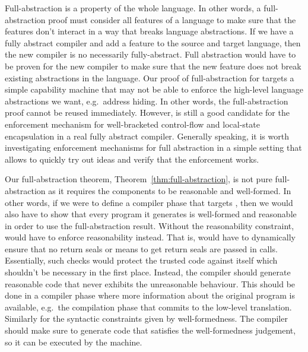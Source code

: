 \begin{jversion}

  Full-abstraction is a property of the whole language.
  In other words, a full-abstraction proof must consider all features of a language to make sure that the features don't interact in a way that breaks language abstractions.
  If we have a fully abstract compiler and add a feature to the source and target language, then the new compiler is no necessarily fully-abstract.
  Full abstraction would have to be proven for the new compiler to make sure that the new feature does not break existing abstractions in the language.
  Our proof of full-abstraction for \stktokens{} targets a simple capability machine that may not be able to enforce the high-level language abstractions we want, e.g.\ address hiding.
  In other words, the full-abstraction proof cannot be reused immediately.
  However, \stktokens{} is still a good candidate for the enforcement mechanism for well-bracketed control-flow and local-state encapsulation in a real fully abstract compiler.
  Generally speaking, it is worth investigating enforcement mechanisms for full abstraction in a simple setting that allows to quickly try out ideas and verify that the enforcement works.

  Our full-abstraction theorem, Theorem~\ref{thm:full-abstraction}, is not pure full-abstraction as it requires the components to be reasonable and well-formed.
  In other words, if we were to define a compiler phase that targets \srccm{}, then we would also have to show that every program it generates is well-formed and reasonable in order to use the full-abstraction result.
  Without the reasonability constraint, \stktokens{} would have to enforce reasonability instead.
  That is, \stktokens{} would have to dynamically ensure that no return seals or means to get return seals are passed in calls.
  Essentially, such checks would protect the trusted code against itself which shouldn't be necessary in the first place.
  Instead, the compiler should generate reasonable code that never exhibits the unreasonable behaviour.
  This should be done in a compiler phase where more information about the original program is available, e.g.\ the compilation phase that commits to the low-level translation.
  Similarly for the syntactic constraints given by well-formedness.
  The compiler should make sure to generate code that satisfies the well-formedness judgement, so it can be executed by the machine.


\end{jversion}
